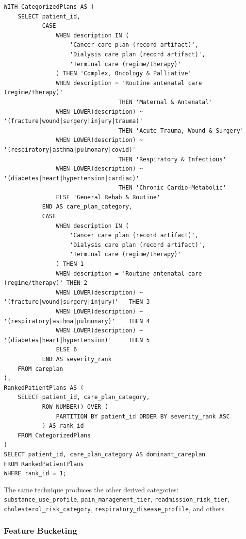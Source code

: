 \begin{lstlisting}[style=sqlstyle]
WITH CategorizedPlans AS (
    SELECT patient_id,
           CASE
               WHEN description IN (
                   'Cancer care plan (record artifact)',
                   'Dialysis care plan (record artifact)',
                   'Terminal care (regime/therapy)'
               ) THEN 'Complex, Oncology & Palliative'
               WHEN description = 'Routine antenatal care (regime/therapy)'
                                 THEN 'Maternal & Antenatal'
               WHEN LOWER(description) ~ '(fracture|wound|surgery|injury|trauma)'
                                 THEN 'Acute Trauma, Wound & Surgery'
               WHEN LOWER(description) ~ '(respiratory|asthma|pulmonary|covid)'
                                 THEN 'Respiratory & Infectious'
               WHEN LOWER(description) ~ '(diabetes|heart|hypertension|cardiac)'
                                 THEN 'Chronic Cardio-Metabolic'
               ELSE 'General Rehab & Routine'
           END AS care_plan_category,
           CASE
               WHEN description IN (
                   'Cancer care plan (record artifact)',
                   'Dialysis care plan (record artifact)',
                   'Terminal care (regime/therapy)'
               ) THEN 1
               WHEN description = 'Routine antenatal care (regime/therapy)' THEN 2
               WHEN LOWER(description) ~ '(fracture|wound|surgery|injury)'   THEN 3
               WHEN LOWER(description) ~ '(respiratory|asthma|pulmonary)'    THEN 4
               WHEN LOWER(description) ~ '(diabetes|heart|hypertension)'     THEN 5
               ELSE 6
           END AS severity_rank
    FROM careplan
),
RankedPatientPlans AS (
    SELECT patient_id, care_plan_category,
           ROW_NUMBER() OVER (
               PARTITION BY patient_id ORDER BY severity_rank ASC
           ) AS rank_id
    FROM CategorizedPlans
)
SELECT patient_id, care_plan_category AS dominant_careplan
FROM RankedPatientPlans
WHERE rank_id = 1;
\end{lstlisting}

The same technique produces the other derived categories: \texttt{substance\_use\_profile}, \texttt{pain\_management\_tier}, \texttt{readmission\_risk\_tier}, \texttt{cholesterol\_risk\_category}, \texttt{respiratory\_disease\_profile}, and others.

\subsubsection*{Feature Bucketing}

